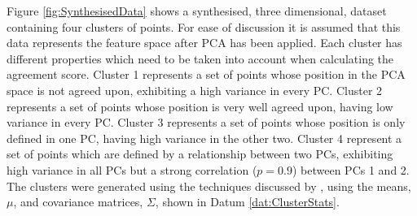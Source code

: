 			Figure \ref{fig:SynthesisedData} shows a synthesised, three dimensional, dataset containing four
			clusters of points. For ease of discussion it is assumed that this data represents the feature
			space after PCA has been applied. Each cluster has different properties which need to be taken into
			account when calculating the agreement score. Cluster 1 represents a set of points whose position
			in the PCA space is not agreed upon, exhibiting a high variance in every PC. Cluster 2 represents a
			set of points whose position is very well agreed upon, having low variance in every PC. Cluster 3
			represents a set of points whose position is only defined in one PC, having high variance in the
			other two. Cluster 4 represent a set of points which are defined by a relationship between two PCs,
			exhibiting high variance in all PCs but a strong correlation ($p = 0.9$) between PCs 1 and 2. The
			clusters were generated using the techniques discussed by \citet{ripley1987stochastic}, using the
			means, $\mu$, and covariance matrices, $\Sigma$, shown in Datum \ref{dat:ClusterStats}.

